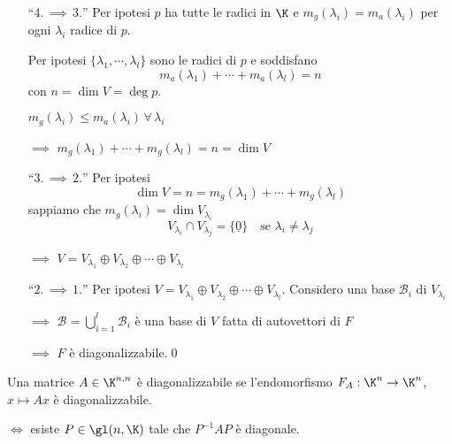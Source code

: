 {\begin{itemize}
        $ \{v_{k_1+1}, \cdots, v_{k_1+k_2}\}  $ è una basee di $ V_{\lambda_1}  $ 
        
        $\implies$ $ \dim V_{\lambda_2} =k_2 $ 
        
        $\implies$ $ m_{g}(\lambda_2)=k_2 $

        Si itera il processo per ogni $ \lambda_{i}  $. 
        
        $\implies$ $ m_{a}(\lambda_{i} )= m_{g}(\lambda_{i} )   $ $ \forall\, i =1, \cdots, l $
        \item [``$4. \,\implies\,3.$''] Per ipotesi $ p $ ha tutte le radici in $ \K $ e $ m_{g}(\lambda_i)=m_{a}(\lambda_i)$ per ogni $ \lambda_{i}  $ radice di $ p $.
        
        Per ipotesi $ \{\lambda_1, \cdots, \lambda_{l} \} $ sono le radici di $ p $ e soddisfano \[m_{a}(\lambda_1)+\cdots+m_{a}(\lambda_{l} ) =n  \] con $ n= \dim V=\deg p $.

        $ m_{g}(\lambda_i)\le m_{a}(\lambda_i) \, \forall\, \lambda_i  $ 
        
        $\implies$ $ m_{g}(\lambda_1)+\cdots+ m_{g}(\lambda_{l} )=n=\dim V   $
        \item [``$3. \,\implies\,2.$''] Per ipotesi \[\dim V=n= m_{g}(\lambda_1)+\cdots+ m_{g}(\lambda_{l} )\] sappiamo che $ m_{g}(\lambda_{i})= \dim V_{\lambda_{i} }   $ \[
            V_{\lambda_{i} }\cap V_{\lambda_{j} }=\{\underline{0}\}\quad\text{se } \lambda_{i}\neq \lambda_j      
        \] 
        
        $\implies$ $ V=V_{\lambda_1}\oplus V_{\lambda_2}\oplus \cdots\oplus V_{\lambda_{l} }     $
        \item [``$2. \,\implies\,1.$''] Per ipotesi $ V=V_{\lambda_1}\oplus V_{\lambda_2}\oplus \cdots\oplus V_{\lambda_{l} } $. Considero una base $ \mathscr{B}_i $ di $ V_{\lambda_{i} }$ 
        
        $\implies$ $ \displaystyle\mathscr{B}=\bigcup_{i=1}^{l} \mathscr{B}_i  $ è una base di $ V $ fatta di autovettori di $ F $ 
        
        $\implies$ $ F $ è diagonalizzabile.\qed
    \end{itemize}
}


Una matrice $ A \in \K^{n,n}$ è diagonalizzabile se l'endomorfismo $ F_{A}: \K^{n}\to \K^{n}  $, $ x \mapsto Ax$ è diagonalizzabile.

$ \iff $ esiste $ P \in \gl (n, \K) $ tale che $ P^{-1}AP $ è diagonale.

